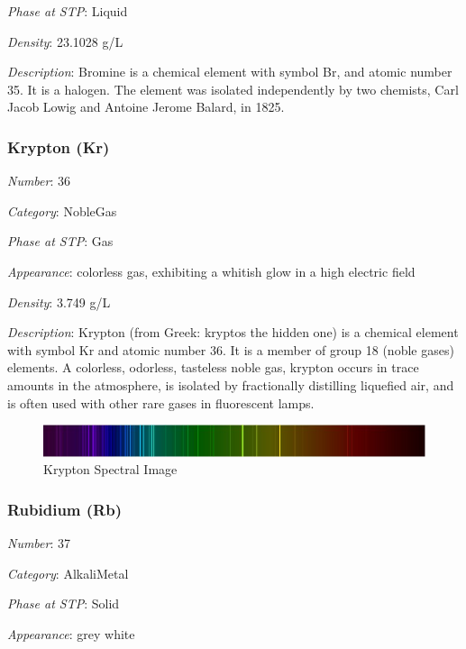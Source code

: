 \documentclass{article}
\begin{document}
\textit{Phase at STP}: Liquid

\textit{Density}: 23.1028 g/L

\textit{Description}: Bromine is a chemical element with symbol Br, and atomic number 35. It is a halogen. The element was isolated independently by two chemists, Carl Jacob Lowig and Antoine Jerome Balard, in 1825.

\hypertarget{subsubsection::Kr}{}\subsubsection{Krypton (Kr)}

\textit{Number}: 36

\textit{Category}: NobleGas

\textit{Phase at STP}: Gas

\textit{Appearance}: colorless gas, exhibiting a whitish glow in a high electric field

\textit{Density}: 3.749 g/L

\textit{Description}: Krypton (from Greek: kryptos the hidden one) is a chemical element with symbol Kr and atomic number 36. It is a member of group 18 (noble gases) elements. A colorless, odorless, tasteless noble gas, krypton occurs in trace amounts in the atmosphere, is isolated by fractionally distilling liquefied air, and is often used with other rare gases in fluorescent lamps.

\immediate{}
\begin{figure}[!ht]
    \centering
    \includegraphics[width=12cm]{./resources/spectral_img/Krypton_Spectrum.jpg}
    \caption{Krypton Spectral Image}
\end{figure}

\hypertarget{subsubsection::Rb}{}\subsubsection{Rubidium (Rb)}

\textit{Number}: 37

\textit{Category}: AlkaliMetal

\textit{Phase at STP}: Solid

\textit{Appearance}: grey white
\end{document}
